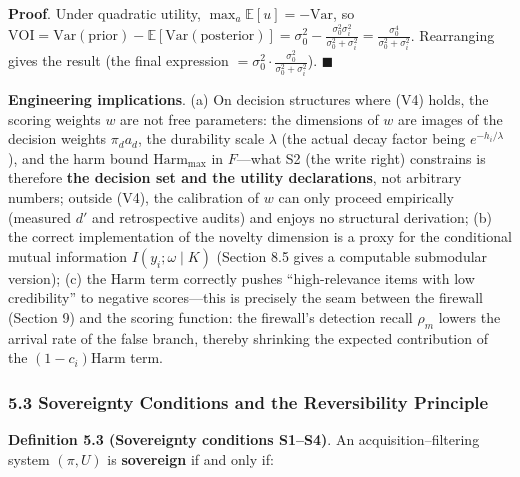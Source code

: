 \documentclass[
  11pt]{article}
\begin{document}
\textbf{Proof}. Under quadratic utility,
\(\max_a \mathbb{E}[u] = -\mathrm{Var}\), so
\(\mathrm{VOI} = \mathrm{Var}(\text{prior}) - \mathbb{E}[\mathrm{Var}(\text{posterior})] = \sigma_0^2 - \frac{\sigma_0^2\sigma_i^2}{\sigma_0^2+\sigma_i^2} = \frac{\sigma_0^4}{\sigma_0^2 + \sigma_i^2}\).
Rearranging gives the result (the final expression
\(= \sigma_0^2 \cdot \frac{\sigma_0^2}{\sigma_0^2+\sigma_i^2}\)).
\(\blacksquare\)

\textbf{Engineering implications}. (a) On decision structures where (V4)
holds, the scoring weights \(w\) are not free parameters: the dimensions
of \(w\) are images of the decision weights \(\pi_d a_d\), the
durability scale \(\lambda\) (the actual decay factor being
\(e^{-h_i/\lambda}\)), and the harm bound \(\mathrm{Harm}_{\max}\) in
\(F\)---what S2 (the write right) constrains is therefore \textbf{the
decision set and the utility declarations}, not arbitrary numbers;
outside (V4), the calibration of \(w\) can only proceed empirically
(measured \(d'\) and retrospective audits) and enjoys no structural
derivation; (b) the correct implementation of the novelty dimension is a
proxy for the conditional mutual information \(I(y_i; \omega \mid K)\)
(Section 8.5 gives a computable submodular version); (c) the
\(\mathrm{Harm}\) term correctly pushes ``high-relevance items with low
credibility'' to negative scores---this is precisely the seam between
the firewall (Section 9) and the scoring function: the firewall's
detection recall \(\rho_m\) lowers the arrival rate of the false branch,
thereby shrinking the expected contribution of the
\((1-c_i)\mathrm{Harm}\) term.

\subsubsection{5.3 Sovereignty Conditions and the Reversibility
Principle}\label{sovereignty-conditions-and-the-reversibility-principle}

\textbf{Definition 5.3 (Sovereignty conditions S1--S4)}. An
acquisition--filtering system \((\pi, U)\) is \textbf{sovereign} if and
only if:
\end{document}
